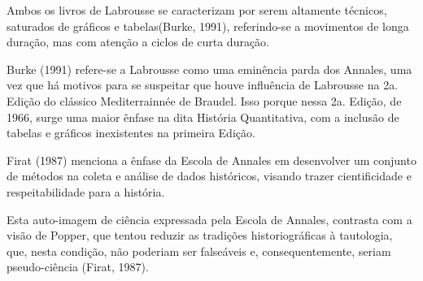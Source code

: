 \documentclass[
12pt,		%
openright,	%
twoside,  %
a4paper,			%
chapter=TITLE,		%
english,			%
french,				%
spanish,			%
brazil				%
]{USPSC-classe/USPSC}
\begin{document}
Ambos os livros de Labrousse se caracterizam por serem altamente t\'ecnicos, \textquotedbl saturados de gr\'aficos e tabelas\textquotedbl   (Burke, 1991), referindo-se a movimentos de longa dura\c{c}\~ao, mas com aten\c{c}\~ao a ciclos de curta dura\c{c}\~ao.

















Burke (1991) refere-se a Labrousse como uma \textquotedbl emin\^encia parda dos Annales\textquotedbl , uma vez que \textquotedbl h\'a motivos para se suspeitar que houve influ\^encia de Labrousse na 2a. Edi\c{c}\~ao do cl\'assico Mediterrainn\'ee de Braudel\textquotedbl . Isso porque nessa 2a. Edi\c{c}\~ao, de 1966, surge uma maior \^enfase na dita Hist\'oria Quantitativa, com a inclus\~ao de tabelas e gr\'aficos inexistentes na primeira Edi\c{c}\~ao.

















 Firat (1987) menciona a \^enfase da Escola de Annales em \textquotedbl desenvolver um conjunto de m\'etodos na coleta e an\'alise de dados hist\'oricos\textquotedbl , visando \textquotedbl trazer cientificidade e respeitabilidade para a hist\'oria\textquotedbl .

















Esta auto-imagem de ci\^encia expressada pela Escola de Annales, contrasta com a vis\~ao de Popper, que tentou reduzir as tradi\c{c}\~oes historiogr\'aficas \`a tautologia, que, nesta condi\c{c}\~ao, n\~ao poderiam ser false\'aveis e, consequentemente, seriam pseudo-ci\^encia  (Firat, 1987).
\end{document}
